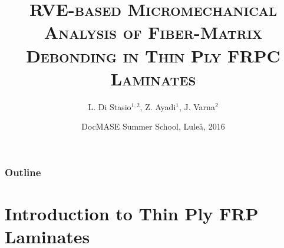 \documentclass[first,firstsupp,lastsupp,handout,last,hyperref,table]{ETHclass}
\makeatletter
\newenvironment{withoutheadline}{
         \setbeamertemplate{headline}{%
\vspace{35pt}
}
    }{}
\makeatother
\begin{document}

\title{\textsc{RVE-based Micromechanical Analysis of Fiber-Matrix Debonding in Thin Ply FRPC Laminates}}
\author{ L. Di Stasio$^{1,2}$, Z. Ayadi$^{1}$, J. Varna$^{2}$}
\date{DocMASE Summer School, Lule\aa , 2016}

\begin{frame}[plain]
    \titlepage
\end{frame}

\begin{withoutheadline}
\begin{frame}
\frametitle{Outline}
\justifying
\vspace*{-0.5cm}
\tableofcontents[hidesubsections]
\end{frame}
\end{withoutheadline}



\section{Introduction to Thin Ply FRP Laminates}
\end{document}
